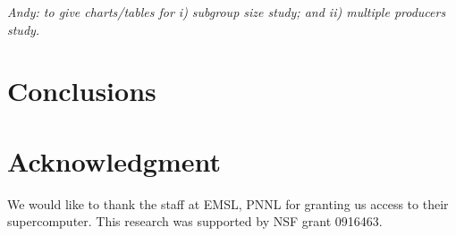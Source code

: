 \documentclass[10pt,journal,letterpaper,compsoc]{IEEEtran}
\begin{document}
{\it Andy: to give charts/tables for i) subgroup size study; and ii) multiple producers study.} 


\section{Conclusions}
\label{secConclusions}



\section*{Acknowledgment}
We would like to thank the staff at EMSL, PNNL for granting us access to their supercomputer. This research was supported by NSF grant 0916463.





%
%
%

\end{document}
